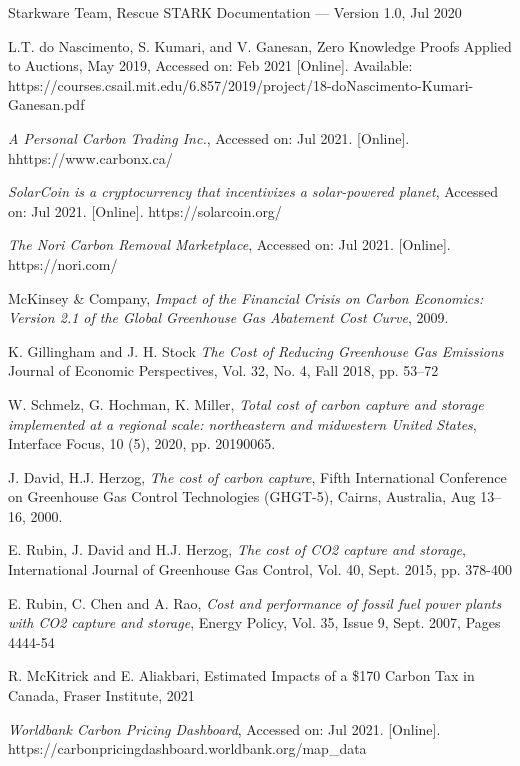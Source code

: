 \documentclass{article}
\begin{document}
\begin{thebibliography}{1}
 Starkware Team, Rescue STARK Documentation — Version 1.0, Jul 2020

 L.T. do Nascimento, S. Kumari, and V. Ganesan, Zero Knowledge Proofs Applied to Auctions, May 2019, Accessed on: Feb 2021 [Online]. Available: https://courses.csail.mit.edu/6.857/2019/project/18-doNascimento-Kumari-Ganesan.pdf

 \textit{A Personal Carbon Trading Inc.}, Accessed on: Jul 2021. [Online]. hhttps://www.carbonx.ca/

 \textit{SolarCoin is a cryptocurrency that incentivizes a solar-powered planet}, Accessed on: Jul 2021. [Online]. https://solarcoin.org/

 \textit{The Nori Carbon Removal Marketplace}, Accessed on: Jul 2021. [Online]. https://nori.com/

 McKinsey \& Company, \textit{Impact of the Financial Crisis on Carbon Economics: Version 2.1 of the Global Greenhouse Gas Abatement Cost Curve}, 2009. 

 K. Gillingham and J. H. Stock \textit{The Cost of Reducing Greenhouse Gas Emissions} Journal of Economic Perspectives, Vol. 32, No. 4, Fall 2018, pp. 53–72

 W. Schmelz, G. Hochman, K. Miller, \textit{Total cost of carbon capture and storage implemented at a regional scale: northeastern and midwestern United States}, Interface Focus, 10 (5), 2020, pp. 20190065.

 J. David, H.J. Herzog, \textit{The cost of carbon capture}, Fifth International Conference on Greenhouse Gas Control Technologies (GHGT-5), Cairns, Australia, Aug 13–16, 2000.

 E. Rubin, J. David and  H.J. Herzog, \textit{The cost of CO2 capture and storage}, International Journal of Greenhouse Gas Control, Vol. 40, Sept. 2015, pp. 378-400

 E. Rubin, C. Chen and A. Rao, \textit{Cost and performance of fossil fuel power plants with CO2 capture and storage}, Energy Policy, Vol. 35, Issue 9, Sept. 2007, Pages 4444-54

 R. McKitrick and E. Aliakbari, Estimated Impacts of a \$170 Carbon Tax in Canada, Fraser Institute, 2021

 \textit{Worldbank Carbon Pricing Dashboard}, Accessed on: Jul 2021. [Online]. https://carbonpricingdashboard.worldbank.org/map\_data


\end{thebibliography}
\end{document}
